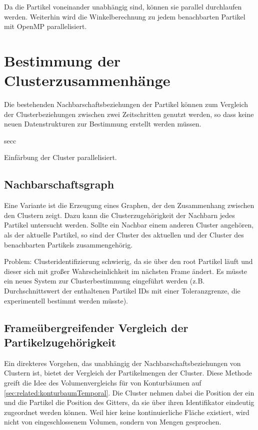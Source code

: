 Da die Partikel voneinander unabhängig sind, können sie parallel durchlaufen werden. Weiterhin wird die Winkelberechnung zu jedem benachbarten Partikel mit OpenMP parallelisiert.

\section{Bestimmung der Clusterzusammenhänge}\label{sec:clusterzusammenhaenge}
Die bestehenden Nachbarschaftsbeziehungen der Partikel können zum Vergleich der Clusterbeziehungen zwischen zwei Zeitschritten genutzt werden, so dass keine neuen Datenstrukturen zur Bestimmung erstellt werden müssen. 

\gls{secc}

Einfärbung der Cluster parallelisiert.

\subsection{Nachbarschaftsgraph}
Eine Variante ist die Erzeugung eines Graphen, der den Zusammenhang zwischen den Clustern zeigt. Dazu kann die Clusterzugehörigkeit der Nachbarn jedes Partikel untersucht werden. Sollte ein Nachbar einem anderen Cluster angehören, als der aktuelle Partikel, so sind der Cluster des aktuellen und der Cluster des benachbarten Partikels zusammengehörig.

Problem: Clusteridentifizierung schwierig, da sie über den root Partikel läuft und dieser sich mit großer Wahrscheinlichkeit im nächsten Frame ändert. Es müsste ein neues System zur Clusterbestimmung eingeführt werden (z.B. Durchschnittswert der enthaltenen Partikel IDs mit einer Toleranzgrenze, die experimentell bestimmt werden müsste).

\subsection{Frameübergreifender Vergleich der Partikelzugehörigkeit}
Ein direkteres Vorgehen, das unabhängig der Nachbarschaftsbeziehungen von Clustern ist, bietet der Vergleich der Partikelmengen der Cluster. Diese Methode greift die Idee des Volumenvergleichs für  von Konturbäumen auf \autoref{sec:related:konturbaumTemporal}. Die Cluster nehmen dabei die Position der  ein und die Partikel die Position des Gitters, da sie über ihren Identifikator eindeutig zugeordnet werden können. Weil hier keine kontinuierliche Fläche existiert, wird nicht von eingeschlossenem Volumen, sondern von Mengen gesprochen.

